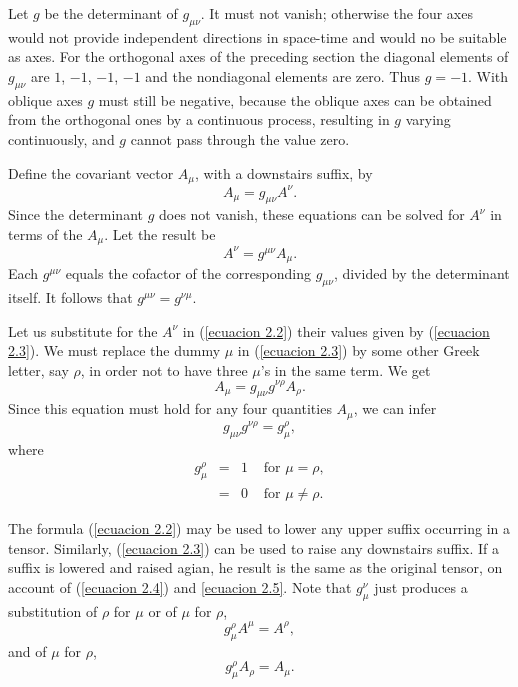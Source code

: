 Let $g$ be the determinant of $g_{\mu\nu}$. It must not vanish; otherwise the 
four axes would not provide independent directions in space-time and would no be 
suitable as axes. For the orthogonal axes of the preceding section the diagonal 
elements of $g_{\mu\nu}$ are $1$, $-1$, $-1$, $-1$ and the nondiagonal elements 
are zero. Thus $g=-1$. With oblique axes $g$ must still be negative, because the 
oblique axes can be obtained from the orthogonal ones by a continuous process, 
resulting in $g$ varying continuously, and $g$ cannot pass through the value 
zero.

Define the covariant vector $A_\mu$, with a downstairs suffix, by
\begin{equation}
 \label{ecuacion 2.2}
 A_\mu = g_{\mu\nu} A^\nu.
\end{equation}
 Since the determinant $g$ does not vanish, these equations can be solved for 
$A^\nu$ in terms of the $A_\mu$. Let the result be
\begin{equation}
 \label{ecuacion 2.3}
 A^\nu = g^{\mu\nu} A_\mu.
\end{equation}
Each $g^{\mu\nu}$ equals the cofactor of the corresponding $g_{\mu\nu}$, 
divided by the determinant itself. It follows that $g^{\mu\nu} = g^{\nu\mu}$.

Let us substitute for the $A^\nu$ in (\ref{ecuacion 2.2}) their values given by 
(\ref{ecuacion 2.3}). We must replace the dummy $\mu$ in (\ref{ecuacion 2.3}) by 
some other Greek letter, say $\rho$, in order not to have three $\mu$'s in the 
same term. We get
\[
 A_\mu = g_{\mu\nu} g^{\nu\rho}A_\rho.
\]
Since this equation must hold for any four quantities $A_\mu$, we can infer 
\begin{equation}
 \label{ecuacion 2.4}
 g_{\mu\nu} g^{\nu\rho} = g_{\mu}^{\rho},
\end{equation}
where
\begin{equation}
 \label{ecuacion 2.5}
 \begin{array}{rclr}
    g_{\mu}^{\rho} & = & 1 & \mbox{ for } \mu = \rho,\\
                   & = & 0 & \mbox{ for } \mu \ne \rho.
 \end{array}
\end{equation}

The formula (\ref{ecuacion 2.2}) may be used to lower any upper suffix 
occurring in a tensor. Similarly, (\ref{ecuacion 2.3}) can be used to raise any 
downstairs suffix. If a suffix is lowered and raised agian, he result is the 
same as the original tensor, on account of (\ref{ecuacion 2.4}) and 
\ref{ecuacion 2.5}. Note that $g_{\mu}^{\nu}$ just produces a substitution of 
$\rho$ for $\mu$ or of $\mu$ for $\rho$,
\[
 g_{\mu}^{\rho} A^{\mu} = A^{\rho},
\]
and of $\mu$ for $\rho$,
\[
 g_{\mu}^{\rho} A_{\rho} = A_{\mu}.
\]

